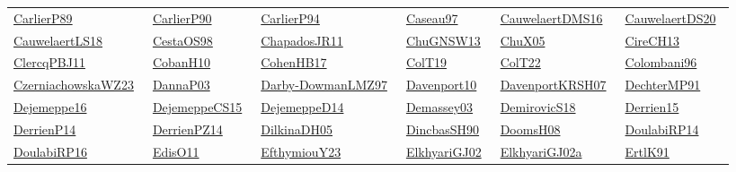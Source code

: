 \begin{longtable}{*{6}{l}}
\href{}{CarlierP89}~\cite{CarlierP89} & \href{works/CarlierP90.pdf}{CarlierP90}~\cite{CarlierP90} & \href{}{CarlierP94}~\cite{CarlierP94} & \href{works/Caseau97.pdf}{Caseau97}~\cite{Caseau97} & \href{works/CauwelaertDMS16.pdf}{CauwelaertDMS16}~\cite{CauwelaertDMS16} & \href{works/CauwelaertDS20.pdf}{CauwelaertDS20}~\cite{CauwelaertDS20}\\ 
\href{works/CauwelaertLS18.pdf}{CauwelaertLS18}~\cite{CauwelaertLS18} & \href{works/CestaOS98.pdf}{CestaOS98}~\cite{CestaOS98} & \href{works/ChapadosJR11.pdf}{ChapadosJR11}~\cite{ChapadosJR11} & \href{works/ChuGNSW13.pdf}{ChuGNSW13}~\cite{ChuGNSW13} & \href{works/ChuX05.pdf}{ChuX05}~\cite{ChuX05} & \href{works/CireCH13.pdf}{CireCH13}~\cite{CireCH13}\\ 
\href{works/ClercqPBJ11.pdf}{ClercqPBJ11}~\cite{ClercqPBJ11} & \href{works/CobanH10.pdf}{CobanH10}~\cite{CobanH10} & \href{works/CohenHB17.pdf}{CohenHB17}~\cite{CohenHB17} & \href{works/ColT19.pdf}{ColT19}~\cite{ColT19} & \href{works/ColT22.pdf}{ColT22}~\cite{ColT22} & \href{works/Colombani96.pdf}{Colombani96}~\cite{Colombani96}\\ 
\href{works/CzerniachowskaWZ23.pdf}{CzerniachowskaWZ23}~\cite{CzerniachowskaWZ23} & \href{works/DannaP03.pdf}{DannaP03}~\cite{DannaP03} & \href{works/Darby-DowmanLMZ97.pdf}{Darby-DowmanLMZ97}~\cite{Darby-DowmanLMZ97} & \href{works/Davenport10.pdf}{Davenport10}~\cite{Davenport10} & \href{works/DavenportKRSH07.pdf}{DavenportKRSH07}~\cite{DavenportKRSH07} & \href{works/DechterMP91.pdf}{DechterMP91}~\cite{DechterMP91}\\ 
\href{works/Dejemeppe16.pdf}{Dejemeppe16}~\cite{Dejemeppe16} & \href{works/DejemeppeCS15.pdf}{DejemeppeCS15}~\cite{DejemeppeCS15} & \href{works/DejemeppeD14.pdf}{DejemeppeD14}~\cite{DejemeppeD14} & \href{works/Demassey03.pdf}{Demassey03}~\cite{Demassey03} & \href{works/DemirovicS18.pdf}{DemirovicS18}~\cite{DemirovicS18} & \href{works/Derrien15.pdf}{Derrien15}~\cite{Derrien15}\\ 
\href{works/DerrienP14.pdf}{DerrienP14}~\cite{DerrienP14} & \href{works/DerrienPZ14.pdf}{DerrienPZ14}~\cite{DerrienPZ14} & \href{works/DilkinaDH05.pdf}{DilkinaDH05}~\cite{DilkinaDH05} & \href{works/DincbasSH90.pdf}{DincbasSH90}~\cite{DincbasSH90} & \href{works/DoomsH08.pdf}{DoomsH08}~\cite{DoomsH08} & \href{works/DoulabiRP14.pdf}{DoulabiRP14}~\cite{DoulabiRP14}\\ 
\href{works/DoulabiRP16.pdf}{DoulabiRP16}~\cite{DoulabiRP16} & \href{works/EdisO11.pdf}{EdisO11}~\cite{EdisO11} & \href{works/EfthymiouY23.pdf}{EfthymiouY23}~\cite{EfthymiouY23} & \href{works/ElkhyariGJ02.pdf}{ElkhyariGJ02}~\cite{ElkhyariGJ02} & \href{works/ElkhyariGJ02a.pdf}{ElkhyariGJ02a}~\cite{ElkhyariGJ02a} & \href{works/ErtlK91.pdf}{ErtlK91}~\cite{ErtlK91}\\ 

\end{longtable}
